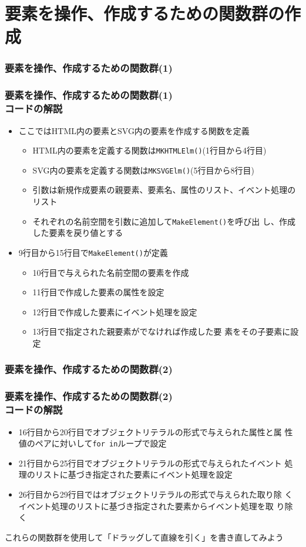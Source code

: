  \section{要素を操作、作成するための関数群の作成}
\begin{frame}[containsverbatim]
 \frametitle{要素を操作、作成するための関数群(1)}
 \end{frame}
\begin{frame}[containsverbatim]
 \frametitle{要素を操作、作成するための関数群(1)\\コードの解説}
\begin{itemize}
 \item ここではHTML内の要素とSVG内の要素を作成する関数を定義
 \begin{itemize}
  \item HTML内の要素を定義する関数は\texttt{MKHTMLElm()}(1行目から4行目)
  \item SVG内の要素を定義する関数は\texttt{MKSVGElm()}(5行目から8行目)
  \item 引数は新規作成要素の親要素、要素名、属性のリスト、イベント処理の
        リスト
  \item それぞれの名前空間を引数に追加して\texttt{MakeElement()}を呼び出
        し、作成した要素を戻り値とする
 \end{itemize}
 \item 9行目から15行目で\texttt{MakeElement()}が定義
       \begin{itemize}
        \item 10行目で与えられた名前空間の要素を作成
        \item 11行目で作成した要素の属性を設定
        \item 12行目で作成した要素にイベント処理を設定
        \item 13行目で指定された親要素がでなければ作成した要
              素をその子要素に設定
       \end{itemize}
\end{itemize}
 \end{frame}
\begin{frame}[containsverbatim]
 \frametitle{要素を操作、作成するための関数群(2)}
 \end{frame}
\begin{frame}[containsverbatim]
 \frametitle{要素を操作、作成するための関数群(2)\\コードの解説}
\begin{itemize}
 \item 16行目から20行目でオブジェクトリテラルの形式で与えられた属性と属
       性値のペアに対いして\texttt{for in}ループで設定
 \item 21行目から25行目でオブジェクトリテラルの形式で与えられたイベント
       処理のリストに基づき指定された要素にイベント処理を設定
 \item 26行目から29行目ではオブジェクトリテラルの形式で与えられた取り除
       くイベント処理のリストに基づき指定された要素からイベント処理を取
       り除く
\end{itemize}
 これらの関数群を使用して「ドラッグして直線を引く」を書き直してみよう

 \end{frame}
